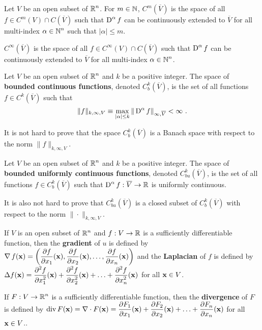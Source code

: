 \begin{defn*}
Let $V$ be an open subset of $\displaystyle \mathbb{R}^n$.  For $m\in \mathbb{N}$,
$\displaystyle C^m(\overline{V})$ is the space of all
$\displaystyle f \in C^m(V) \cap C(\overline{V})$ such that
$\displaystyle \operatorname{D}^\alpha f$ can be continuously extended
to $\overline{V}$ for
all multi-index $\displaystyle \alpha \in \mathbb{N}^n$ such that $|\alpha|\leq m$.

$\displaystyle C^\infty(\overline{V})$ is the space of all
$\displaystyle f \in C^\infty(V) \cap C(\overline{V})$ such that
$\displaystyle \operatorname{D}^\alpha f$ can be continuously extended to
$\overline{V}$ for all multi-index $\displaystyle \alpha \in \mathbb{N}^n$.
\end{defn*}

\begin{defn*}
Let $V$ be an open subset of $\displaystyle \mathbb{R}^n$ and $k$ be a
positive integer.  The space of {\bfseries bounded continuous
functions}, denoted
$\displaystyle C_b^k(\overline{V})$, is the set of all functions
$\displaystyle f\in C^k\left(\overline{V}\right)$ such that
\[
\|f\|_{k,\infty,V} \equiv \max_{|\alpha|\leq k}
\|\operatorname{D}^\alpha f\|_{\infty,\overline{V}} < \infty \ .
\]
\end{defn*}

It is not hard to prove that the space
$\displaystyle C^k_b(\overline{V})$ is a Banach space
with respect to the norm $\displaystyle \|f\|_{k,\infty,V}$.

\begin{defn*}
Let $V$ be an open subset of $\displaystyle \mathbb{R}^n$ and $k$ be a
positive integer.  The space of {\bfseries bounded uniformly continuous
functions}, denoted
$\displaystyle C_{bu}^k(\overline{V})$, is the set of all functions
$\displaystyle f\in C_b^k\left(\overline{V}\right)$ such that
$\displaystyle \operatorname{D}^\alpha f:\overline{V} \to \mathbb{R}$ is uniformly
continuous.
\end{defn*}

It is also not hard to prove that
$\displaystyle C_{bu}^k(\overline{V})$ is a closed subset of
$\displaystyle C_b^k\left(\overline{V}\right)$ with respect to the
norm $\|\cdot\|_{k,\infty,V}$.

\begin{defn}
If $V$ is an open subset of $\displaystyle \mathbb{R}^n$ and $f:V \to \mathbb{R}$ is a
sufficiently differentiable function, then the
{\bfseries gradient} of $u$ is defined by
$\displaystyle \operatorname{\nabla} f(\mathbf{x})
= \left( \frac{\partial{f}}{\partial x_1}(\mathbf{x}) , \frac{\partial{f}}{\partial x_2}(\mathbf{x}) ,
\ldots, \frac{\partial{f}}{\partial x_n}(\mathbf{x}) \right)$ and the
{\bfseries Laplacian} of $f$ is defined by
$\displaystyle \Delta f(\mathbf{x})
= \frac{\displaystyle \partial^{2}{f}} {\displaystyle \partial x_1^{2}}(\mathbf{x}) + \frac{\displaystyle \partial^{2}{f}} {\displaystyle \partial x_2^{2}}(\mathbf{x}) +
\ldots + \frac{\displaystyle \partial^{2}{f}} {\displaystyle \partial x_n^{2}}(\mathbf{x})$ for all $\mathbf{x} \in V$.

If $\displaystyle F:V \to \mathbb{R}^n$ is a sufficiently differentiable
function, then the {\bfseries divergence} of $F$ is
defined by $\displaystyle \operatorname{div} F(\mathbf{x}) = \nabla \cdot F(\mathbf{x})
= \frac{\partial{F_1}}{\partial x_1}(\mathbf{x}) + \frac{\partial{F_2}}{\partial x_2}(\mathbf{x}) +
\ldots + \frac{\partial{F_n}}{\partial x_n}(\mathbf{x})$ for all $\mathbf{x} \in V$..
\end{defn}

